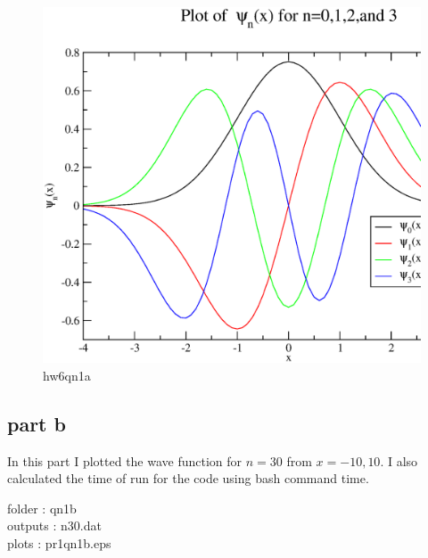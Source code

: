 \documentclass[11pt,a4paper,english]{article}
\begin{document}
	\begin{figure}[h!]
	\centering
	\includegraphics [scale=0.6]{pr1qn1a.eps}
	\caption{hw6qn1a }
	\end{figure}
	\clearpage
	
	
	
	\subsection{part b}
In this part I plotted the wave function for $n=30$ from $x=-10,10$. I also calculated the time of run for the code using bash command time.

    folder       : qn1b\\
	outputs      : n30.dat\\
	plots        : pr1qn1b.eps\\
		
\end{document}
